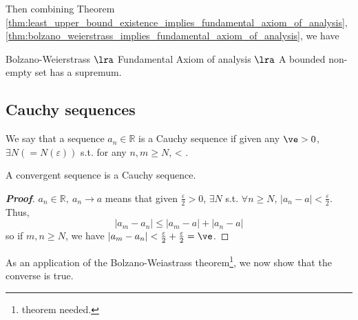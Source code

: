Then combining Theorem \ref{thm:least_upper_bound_existence_implies_fundamental_axiom_of_analysis}, \ref{thm:bolzano_weierstrass_implies_fundamental_axiom_of_analysis}, we have
\begin{theorem}
Bolzano-Weierstrass $\lra$ Fundamental Axiom of analysis $\lra$ A bounded non-empty set has a supremum.
\end{theorem}


\subsection{Cauchy sequences}%

\begin{definition}
We say that a sequence $a_n\in \mathbb{R}$ is a Cauchy sequence if given any $\ve>0$, $\exists N(=N(\varepsilon))$ s.t. for any $n,m\geq N$,
\be
{}< \ve.
\ee
\end{definition}

\begin{lemma}
A convergent sequence is a Cauchy sequence.
\end{lemma}
\begin{proof}[{\bf Proof}]
$a_n\in\mathbb{R}, \ a_n\to a$ means that given $\frac{\varepsilon}{2}>0$, $\exists N$ s.t. $\forall n\geq N$, $|a_n-a|<\frac{\varepsilon}{2}$. Thus,
\begin{equation*}
|a_m-a_n|\leq |a_m-a| + |a_n-a|
\end{equation*}
so if $m,n\geq N$, we have $|a_m-a_n| < \frac{\varepsilon}{2} + \frac{\varepsilon}{2} = \ve$.
\end{proof}

As an application of the Bolzano-Weiastrass theorem\footnote{theorem needed.}, we now show that the converse is true.


